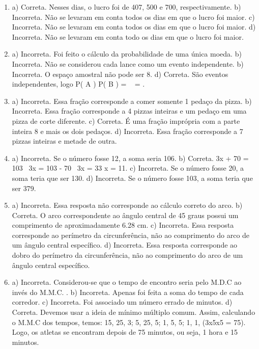 \begin{enumerate}
\item a) Correta. Nesses dias, o lucro foi de 407, 500 e 700, respectivamente.
b) Incorreta. Não se levaram em conta todos os dias em que o lucro foi maior.
c) Incorreta. Não se levaram em conta todos os dias em que o lucro foi maior.
d) Incorreta. Não se levaram em conta todo os dias em que o lucro foi maior.


\item a) Incorreta. Foi feito o cálculo da probabilidade de uma única moeda.
b) Incorreta. Não se considerou cada lance como um evento independente.
b) Incorreta. O espaço amostral não pode ser 8.
d) Correta. São eventos independentes, logo
P\left( A \right) \times P\left( B \right) = \  \times {} = .


\item a) Incorreta. Essa fração corresponde a comer somente 1 pedaço da pizza.
b) Incorreta. Essa fração corresponde a 4 pizzas inteiras e um pedaço em uma pizza de corte diferente.
c) Correta. É uma fração imprópria com a parte inteira 8 e mais os dois pedaços.
d) Incorreta. Essa fração corresponde a 7 pizzas inteiras e metade de outra.


\item a) Incorreta. Se o número fosse 12, a soma seria 106.
b) Correta. 3x + 70 = 103 \rightarrow \ 3x = 103 - 70 \rightarrow \ 3x = 33 \rightarrow x = 11.
c) Incorreta. Se o número fosse 20, a soma teria que ser 130.
d) Incorreta. Se o número fosse 103, a soma teria que ser 379.


\item a) Incorreta. Essa resposta não corresponde ao cálculo correto do arco.
b) Correta. O arco correspondente ao ângulo central de 45 graus possui um comprimento de aproximadamente 6.28 cm.
c) Incorreta. Essa resposta corresponde ao perímetro da
circunferência, não ao comprimento do arco de um ângulo central específico.
d) Incorreta. Essa resposta corresponde ao dobro do perímetro da circunferência, não ao comprimento do arco de um ângulo central específico.


\item a) Incorreta. Considerou-se que o tempo de encontro seria pelo M.D.C ao invés do M.M.C. . 
b) Incorreta. Apenas foi feita a soma do
tempo de cada corredor. 
c) Incorreta. Foi associado um número
errado de minutos. 
d) Correta. Devemos usar a ideia de mínimo múltiplo comum. Assim, calculando o M.M.C dos tempos, temos: 15, 25, 3; 5, 25, 5; 1, 5, 5; 1, 1, (3x5x5 = 75). Logo, os atletas se encontram depois de 75 minutos, ou seja, 1 hora e 15 minutos.



\end{enumerate}
